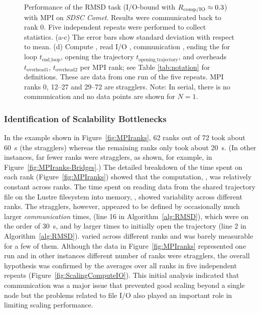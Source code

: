 \begin{figure}[!htb]
  \caption{Performance of the RMSD task (I/O-bound with $R_{\text{comp/IO}} \approx 0.3$) with MPI on \emph{SDSC Comet}.
    Results were communicated back to rank 0.
    Five independent repeats were performed to collect statistics.
    (a-c) The error bars show standard deviation with respect to mean.
    (d) Compute \tcomp, read I/O \tIO, communication \tcomm, ending the for loop $t_{\text{end\_loop}}$, opening the trajectory $t_{\text{opening\_trajectory}}$, and overheads $t_{\text{overhead1}}$, $t_{\text{overhead2}}$ per MPI rank; see Table \ref{tab:notation} for definitions.
    These are data from one run of the five repeats.
    MPI ranks 0, 12--27 and 29--72 are stragglers.
    Note: In serial, there is no communication and no data points are shown for $N=1$.}
  \label{fig:MPIwithIO}
\end{figure} 

\subsubsection*{Identification of Scalability Bottlenecks}

In the example shown in Figure~\ref{fig:MPIranks}, 62 ranks out of 72 took about 60~s (the stragglers) whereas the remaining ranks only took about 20~s.
(In other instances, far fewer ranks were stragglers, as shown, for example, in Figure~\ref{fig:MPIranks-Bridges}.)
The detailed breakdown of the time spent on each rank (Figure~\ref{fig:MPIranks}) showed that the computation, \tcomp, was relatively constant across ranks. 
The time spent on reading data from the shared trajectory file on the Lustre filesystem into memory, \tIO, showed variability across different ranks. 
The stragglers, however, appeared to be defined by occasionally much larger \emph{communication} times, \tcomm (line 16 in Algorithm~\ref{alg:RMSD}), which were on the order of 30~s, and by larger times to initially open the trajectory (line 2 in Algorithm~\ref{alg:RMSD}).
\tcomm varied across different ranks and was barely measurable for a few of them.
Although the data in Figure~\ref{fig:MPIranks} represented one run and in other instances different number of ranks were stragglers, the overall hypothesis was confirmed by the averages over all ranks in five independent repeats (Figure~\ref{fig:ScalingComputeIO}).
This initial analysis indicated that communication was a major issue that prevented good scaling beyond a single node but the problems related to file I/O also played an important role in limiting scaling performance.


